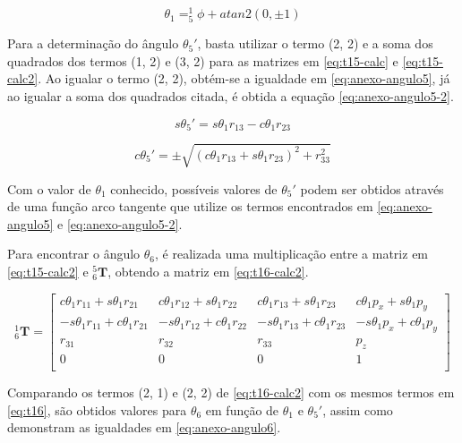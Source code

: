 \begin{equation}
    \label{eq:anexo-angulo1-final}
    \theta_1 = ^1_5\phi + atan2\left(0, \pm1\right)
\end{equation}

Para a determinação do ângulo $\theta_5'$, basta utilizar o termo (2, 2) e a soma dos quadrados 
dos termos (1, 2) e (3, 2) para as matrizes em \ref{eq:t15-calc} e \ref{eq:t15-calc2}. 
Ao igualar o termo (2, 2), obtém-se a igualdade em \ref{eq:anexo-angulo5}, já ao igualar 
a soma dos quadrados citada, é obtida a equação \ref{eq:anexo-angulo5-2}. 

\begin{equation}
    \label{eq:anexo-angulo5}
    s\theta_5' = s\theta_1r_{13} - c\theta_1r_{23}
\end{equation}

\begin{equation}
    \label{eq:anexo-angulo5-2}
    c\theta_5' = \pm \sqrt{(c\theta_1r_{13} + s\theta_1r_{23})^2 + r_{33}^2}
\end{equation}

Com o valor de $\theta_1$ conhecido, possíveis valores de $\theta_5'$ podem ser obtidos 
através de uma função arco tangente que utilize os termos encontrados em \ref{eq:anexo-angulo5}
e \ref{eq:anexo-angulo5-2}.

Para encontrar o ângulo $\theta_6$, é realizada uma multiplicação entre a matriz em 
\ref{eq:t15-calc2} e $^5_6\textbf{T}$, obtendo a matriz em \ref{eq:t16-calc2}.

\begin{equation}
    \label{eq:t16-calc2}
    ^1_6\textbf{T} = 
    \begin{bmatrix}
         c\theta_1r_{11} + s\theta_1r_{21} &  c\theta_1r_{12} + s\theta_1r_{22} & c\theta_1r_{13} + s\theta_1r_{23} & c\theta_1p_x + s\theta_1p_y \\
        -s\theta_1r_{11} + c\theta_1r_{21} & -s\theta_1r_{12} + c\theta_1r_{22} & -s\theta_1r_{13} +c\theta_1r_{23} & -s\theta_1p_x + c\theta_1p_y \\
        r_{31}                             &         r_{32}                     &     r_{33}                        &      p_z  \\
         0             &            0         &              0            &           1         \\    
    \end{bmatrix}
\end{equation}

Comparando os termos (2, 1) e (2, 2) de \ref{eq:t16-calc2} com os mesmos termos em \ref{eq:t16}, são obtidos valores para $\theta_6$
em função de $\theta_1$ e $\theta_5'$, assim como demonstram as igualdades em \ref{eq:anexo-angulo6}.

